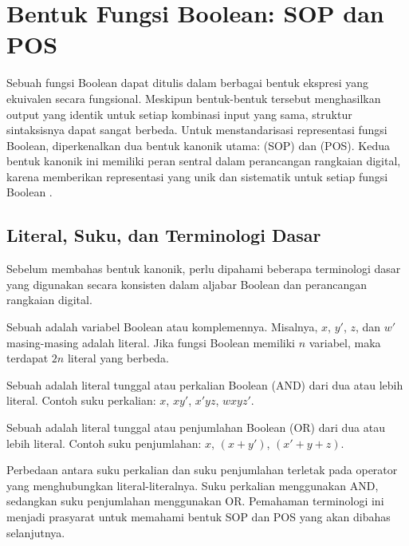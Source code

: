 \section{Bentuk Fungsi Boolean: SOP dan POS}

Sebuah fungsi Boolean dapat ditulis dalam berbagai bentuk ekspresi yang ekuivalen secara fungsional. Meskipun bentuk-bentuk tersebut menghasilkan output yang identik untuk setiap kombinasi input yang sama, struktur sintaksisnya dapat sangat berbeda. Untuk menstandarisasi representasi fungsi Boolean, diperkenalkan dua bentuk kanonik utama:  (SOP) dan  (POS). Kedua bentuk kanonik ini memiliki peran sentral dalam perancangan rangkaian digital, karena memberikan representasi yang unik dan sistematik untuk setiap fungsi Boolean \cite{rosen2019}.

\subsection{Literal, Suku, dan Terminologi Dasar}

Sebelum membahas bentuk kanonik, perlu dipahami beberapa terminologi dasar yang digunakan secara konsisten dalam aljabar Boolean dan perancangan rangkaian digital.

\begin{definisi}[Literal]
Sebuah  adalah variabel Boolean atau komplemennya. Misalnya, $x$, $y'$, $z$, dan $w'$ masing-masing adalah literal. Jika fungsi Boolean memiliki $n$ variabel, maka terdapat $2n$ literal yang berbeda.
\end{definisi}

\begin{definisi}
Sebuah  adalah literal tunggal atau perkalian Boolean (AND) dari dua atau lebih literal. Contoh suku perkalian: $x$, $xy'$, $x'yz$, $wxyz'$.
\end{definisi}

\begin{definisi}
Sebuah  adalah literal tunggal atau penjumlahan Boolean (OR) dari dua atau lebih literal. Contoh suku penjumlahan: $x$, $(x + y')$, $(x' + y + z)$.
\end{definisi}

Perbedaan antara suku perkalian dan suku penjumlahan terletak pada operator yang menghubungkan literal-literalnya. Suku perkalian menggunakan AND, sedangkan suku penjumlahan menggunakan OR. Pemahaman terminologi ini menjadi prasyarat untuk memahami bentuk SOP dan POS yang akan dibahas selanjutnya.

